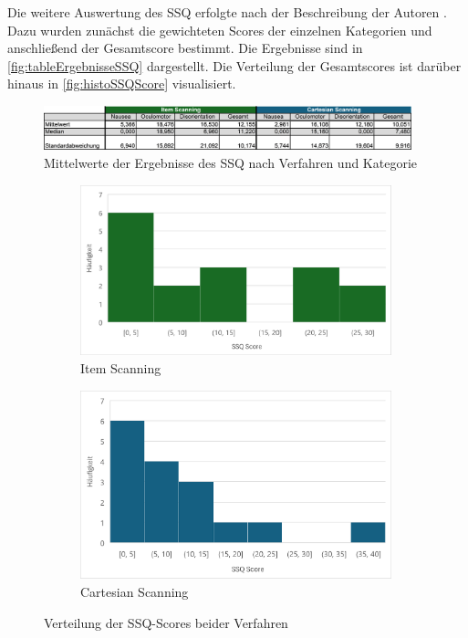 Die weitere Auswertung des SSQ erfolgte nach der Beschreibung der Autoren \citep{kennedy_simulator_1993}. Dazu wurden zunächst die gewichteten Scores der einzelnen Kategorien und anschließend der Gesamtscore bestimmt. Die Ergebnisse sind in \autoref{fig:tableErgebnisseSSQ} dargestellt. Die Verteilung der Gesamtscores ist darüber hinaus in \autoref{fig:histoSSQScore} visualisiert. 

\begin{figure}[tbh]
    \centering
    \includegraphics[width=0.95\textwidth]{images/Results/Tabelle-Ergebnisse-SSQ.png}
    \caption{Mittelwerte der Ergebnisse des SSQ nach Verfahren und Kategorie}
    \label{fig:tableErgebnisseSSQ}
\end{figure}

\begin{figure}
    \centering
    \begin{subfigure}{.5\textwidth}
        \centering
        \includegraphics[width=0.99\textwidth]{images/Results/Histogramm-SSQScores-Item.png}
        \caption{Item Scanning}
        \label{fig:histoSSQItem}   
    \end{subfigure}%
    \begin{subfigure}{.5\textwidth}
        \centering
        \includegraphics[width=0.99\textwidth]{images/Results/Histogramm-SSQScores-Cartesian.png}
         \caption{Cartesian Scanning}
         \label{fig:histoSSQCartesian}
    \end{subfigure}
    \caption{Verteilung der SSQ-Scores beider Verfahren}
    \label{fig:histoSSQScore}
\end{figure}

